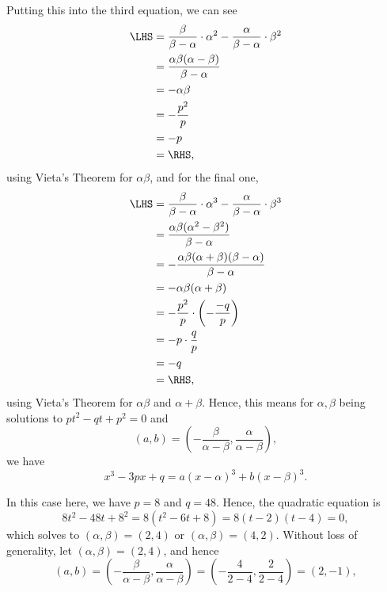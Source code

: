 Putting this into the third equation, we can see
\begin{align*}
    \LHS & = \frac{\beta}{\beta - \alpha} \cdot \alpha^2 - \frac{\alpha}{\beta - \alpha} \cdot \beta^2 \\
         & = \frac{\alpha\beta (\alpha - \beta)}{\beta - \alpha}                                       \\
         & = -\alpha \beta                                                                             \\
         & = - \frac{p^2}{p}                                                                           \\
         & = -p                                                                                        \\
         & = \RHS,
\end{align*}
using Vieta's Theorem for \(\alpha\beta\), and for the final one,
\begin{align*}
    \LHS & = \frac{\beta}{\beta - \alpha} \cdot \alpha^3 - \frac{\alpha}{\beta - \alpha} \cdot \beta^3 \\
         & = \frac{\alpha\beta (\alpha^2 - \beta^2)}{\beta - \alpha}                                   \\
         & =  - \frac{\alpha\beta (\alpha + \beta) (\beta - \alpha)}{\beta - \alpha}                   \\
         & = -\alpha\beta (\alpha + \beta)                                                             \\
         & = -\frac{p^2}{p} \cdot \left(- \frac{-q}{p}\right)                                          \\
         & = -p \cdot \frac{q}{p}                                                                      \\
         & = -q                                                                                        \\
         & = \RHS,
\end{align*}
using Vieta's Theorem for \(\alpha\beta\) and \(\alpha + \beta\). Hence, this means for \(\alpha, \beta\) being solutions to \(pt^2 - qt + p^2 = 0\) and
\[
    (a, b) = \left(-\frac{\beta}{\alpha - \beta}, \frac{\alpha}{\alpha - \beta}\right),
\]
we have
\[
    x^3 - 3px + q = a (x - \alpha)^3 + b (x - \beta)^3.
\]

In this case here, we have \(p = 8\) and \(q = 48\). Hence, the quadratic equation is
\[
    8t^2 - 48t + 8^2 = 8 (t^2 - 6t + 8) = 8 (t - 2)(t - 4) = 0,
\]
which solves to \((\alpha, \beta) = (2, 4)\) or \((\alpha, \beta) = (4, 2)\). Without loss of generality, let \((\alpha, \beta) = (2, 4)\), and hence
\[
    (a, b) = \left(-\frac{\beta}{\alpha - \beta}, \frac{\alpha}{\alpha - \beta}\right) = \left(-\frac{4}{2 - 4}, \frac{2}{2 - 4}\right) = \left(2, -1\right),
\]

